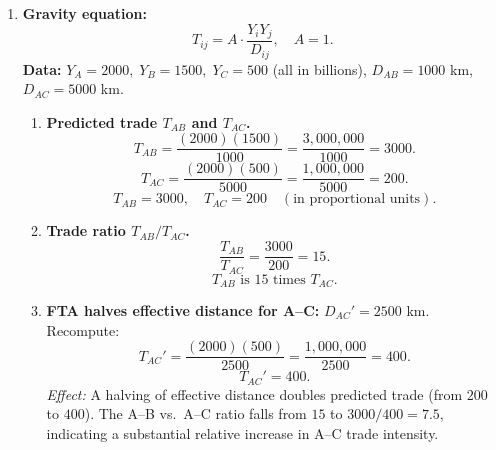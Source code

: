 \documentclass[12pt]{article}
\begin{document}
\begin{enumerate}
\begin{enumerate}[label=(\alph*)]
\item \textbf{Trade pattern at world relative price $P_W/P_C=1.5$.}
In a one-factor Ricardian model, a country produces the good for which the world relative price exceeds its autarky unit-cost ratio (its opportunity cost). Home will produce/export Wine if
\[
\frac{P_W}{P_C} > \frac{a_{LW}}{a_{LC}} = 2.
\]
But $1.5 < 2$, so Home does \emph{not} produce Wine; it produces Cheese.

Foreign will produce/export Wine if
\[
\frac{P_W}{P_C} > \frac{a_{LW}^*}{a_{LC}^*} = 3.
\]
But $1.5 < 3$, so Foreign also produces Cheese.

\textit{Conclusion:} At $P_W/P_C=1.5$, Wine is relatively cheap compared to both countries' opportunity costs, so \emph{both} countries supply Cheese and import Wine (from the rest of the world). If we restrict the world to only these two countries, such a price cannot be an equilibrium; an equilibrium relative price must lie between $2$ and $3$ for mutually consistent specialization (Home in Wine, Foreign in Cheese).
\end{enumerate}

\bigskip
\hrule
\bigskip


\item \textbf{Gravity equation:} 
\[
T_{ij} = A \cdot \frac{Y_i Y_j}{D_{ij}}, \quad A=1.
\]
\textbf{Data:} $Y_A=2000,\; Y_B=1500,\; Y_C=500$ (all in billions), $D_{AB}=1000$ km, $D_{AC}=5000$ km.

\begin{enumerate}[label=(\alph*)]
\item \textbf{Predicted trade $T_{AB}$ and $T_{AC}$.}
\[
T_{AB}=\frac{(2000)(1500)}{1000}=\frac{3{,}000{,}000}{1000}=3000.
\]
\[
T_{AC}=\frac{(2000)(500)}{5000}=\frac{1{,}000{,}000}{5000}=200.
\]
\[
\boxed{T_{AB}=3000,\quad T_{AC}=200 \quad (\text{in proportional units}).}
\]

\item \textbf{Trade ratio $T_{AB}/T_{AC}$.}
\[
\frac{T_{AB}}{T_{AC}}=\frac{3000}{200}=15.
\]
\[
\boxed{T_{AB} \text{ is 15 times } T_{AC}.}
\]

\item \textbf{FTA halves effective distance for A--C: } $D_{AC}'=2500$ km. Recompute:
\[
T_{AC}'=\frac{(2000)(500)}{2500}=\frac{1{,}000{,}000}{2500}=400.
\]
\[
\boxed{T_{AC}'=400.}
\]
\textit{Effect:} A halving of effective distance doubles predicted trade (from $200$ to $400$). The A--B vs.\ A--C ratio falls from $15$ to $3000/400=7.5$, indicating a substantial relative increase in A--C trade intensity.
\end{enumerate}
\end{enumerate}
\end{document}
